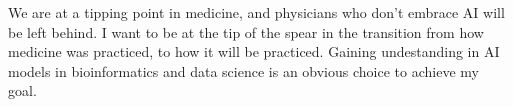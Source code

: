 \documentclass[12pt]{extarticle}
\begin{document}
We are at a tipping point in medicine, and physicians who don't embrace AI will be left behind. I want to be at the tip of the spear in the transition from how medicine was practiced, to how it will be practiced. Gaining undestanding in AI models in bioinformatics and data science is an obvious choice to achieve my goal. 
\end{document}
